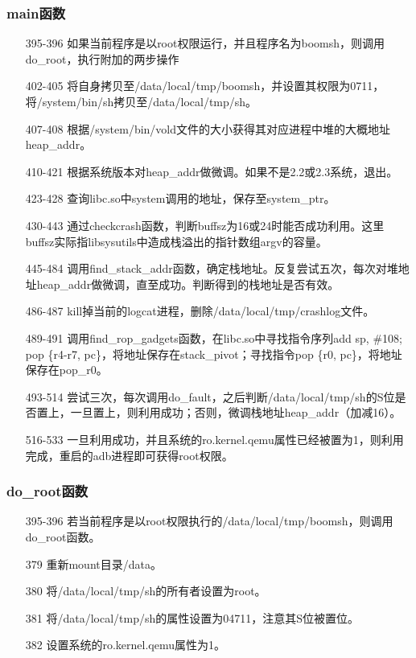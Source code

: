 \subsubsection{main函数}

\begin{itemize}
\item[395-396] 如果当前程序是以root权限运行，并且程序名为boomsh，则调用do\_root，执行附加的两步操作
\item[402-405] 将自身拷贝至/data/local/tmp/boomsh，并设置其权限为0711，将/system/bin/sh拷贝至/data/local/tmp/sh。
\item[407-408] 根据/system/bin/vold文件的大小获得其对应进程中堆的大概地址heap\_addr。
\item[410-421] 根据系统版本对heap\_addr做微调。如果不是2.2或2.3系统，退出。
\item[423-428] 查询libc.so中system调用的地址，保存至system\_ptr。
\item[430-443] 通过checkcrash函数，判断buffsz为16或24时能否成功利用。这里buffsz实际指libsysutils中造成栈溢出的指针数组argv的容量。
\item[445-484] 调用find\_stack\_addr函数，确定栈地址。反复尝试五次，每次对堆地址heap\_addr做微调，直至成功。判断得到的栈地址是否有效。
\item[486-487] kill掉当前的logcat进程，删除/data/local/tmp/crashlog文件。
\item[489-491] 调用find\_rop\_gadgets函数，在libc.so中寻找指令序列add sp, \#108; pop \{r4-r7, pc\}，将地址保存在stack\_pivot；寻找指令pop \{r0, pc\}，将地址保存在pop\_r0。
\item[493-514] 尝试三次，每次调用do\_fault，之后判断/data/local/tmp/sh的S位是否置上，一旦置上，则利用成功；否则，微调栈地址heap\_addr（加减16）。
\item[516-533] 一旦利用成功，并且系统的ro.kernel.qemu属性已经被置为1，则利用完成，重启的adb进程即可获得root权限。
\end{itemize}

\subsubsection{do\_root函数}

\begin{itemize}
\item[395-396] 若当前程序是以root权限执行的/data/local/tmp/boomsh，则调用do\_root函数。
\item[379] 重新mount目录/data。
\item[380] 将/data/local/tmp/sh的所有者设置为root。
\item[381] 将/data/local/tmp/sh的属性设置为04711，注意其S位被置位。
\item[382] 设置系统的ro.kernel.qemu属性为1。
\end{itemize}

